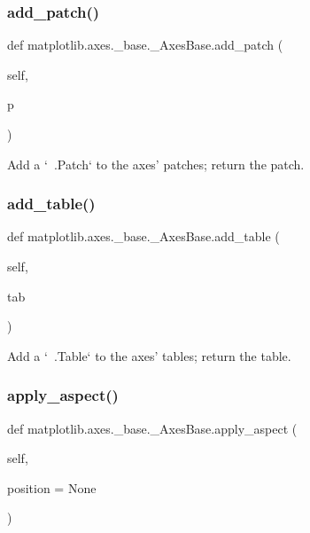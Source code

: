 \subsubsection{\texorpdfstring{add\+\_\+patch()}{add\_patch()}}
{\footnotesize\ttfamily def matplotlib.\+axes.\+\_\+base.\+\_\+\+Axes\+Base.\+add\+\_\+patch (\begin{DoxyParamCaption}\item[{}]{self,  }\item[{}]{p }\end{DoxyParamCaption})}

\begin{DoxyVerb}Add a `~.Patch` to the axes' patches; return the patch.
\end{DoxyVerb}
 \mbox{\label{classmatplotlib_1_1axes_1_1__base_1_1__AxesBase_ad25a62ec722c28ab4fb3181f9d61392d}} 
\subsubsection{\texorpdfstring{add\+\_\+table()}{add\_table()}}
{\footnotesize\ttfamily def matplotlib.\+axes.\+\_\+base.\+\_\+\+Axes\+Base.\+add\+\_\+table (\begin{DoxyParamCaption}\item[{}]{self,  }\item[{}]{tab }\end{DoxyParamCaption})}

\begin{DoxyVerb}Add a `~.Table` to the axes' tables; return the table.
\end{DoxyVerb}
 \mbox{\label{classmatplotlib_1_1axes_1_1__base_1_1__AxesBase_aa084ec41dd68497e342597d4ae163e93}} 
\subsubsection{\texorpdfstring{apply\+\_\+aspect()}{apply\_aspect()}}
{\footnotesize\ttfamily def matplotlib.\+axes.\+\_\+base.\+\_\+\+Axes\+Base.\+apply\+\_\+aspect (\begin{DoxyParamCaption}\item[{}]{self,  }\item[{}]{position = {\ttfamily None} }\end{DoxyParamCaption})}


